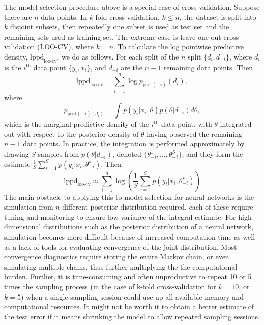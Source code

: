 \documentclass[12pt]{report}
\begin{document}
The model selection procedure above is a special case of cross-validation. Suppose there are $n$ data points. In $k$-fold cross validation,
$k\le n$, the dataset is split into $k$ disjoint subsets, then repeatedly one
subset is used as test set and the remaining sets used as training set. The
extreme case is leave-one-out cross-validation (LOO-CV), where $k=n$. To
calculate the log pointwise predictive density, $\text{lppd}_{\text{loo-cv}}$, we do as
follows. For each split of the $n$ split $\{d_i,d_{-i}\}$, where $d_i$ is the
$i^{\text{th}}$ data point $\{y_i,x_i\}$, and $d_{-i}$ are the $n-1$ remaining data points.
Then
\[ \text{lppd}_{\text{loo-cv}} = \sum_{i=1}^n \log p_{\text{post}(-i)}(d_i), \]
where 
\[p_{\text{post}(-i)(d_i)} = \int p(y_i|x_i,\theta) p(\theta |d_{-i}) d\theta, \]
which is the marginal predictive density of the $i^\text{th}$ data point, with $\theta$
integrated out with respect to the posterior density of $\theta$ having observed
the remaining $n-1$ data points. In practice, the integration is performed
approximately by drawing $S$ samples from $p(\theta|d_{-i})$, denoted
$\{\theta_{-i}^1,\dots, \theta_{-i}^S\}$, and they form the estimate
$\frac{1}{S} \sum_{s=1}^S p(y_i|x_i,\theta_{-i}^s) $.
Then
\[\text{lppd}_{\text{loo-cv}} \approx \sum_{i=1}^n \log (\frac{1}{S} \sum_{s=1}^S
p(y_i|x_i,\theta_{-i}^s))\]
The main obstacle to applying this to model selection for neural networks is the
simulation from $n$ different posterior distribution required, each of these
require tuning and monitoring to ensure low variance of the integral estimate.
For high dimensional distributions such as the posterior distribution of a neural
network, simulation becomes more difficult because of increased computation time as
well as a lack of tools for evaluating convergence of the joint distribution.
Most convergence diagnostics require storing the entire Markov chain, or even
simulating multiple chains, thus further multiplying the the computational burden. Further, it is time-consuming and often unproductive to repeat 10 or 5 times the sampling process  
(in the case of k-fold cross-validation for $k=10$, or $k=5$) when a single sampling session could use up all available memory and computational resources. 
It might not be worth it to obtain a better estimate of the test error if it means shrinking the model to allow repeated sampling sessions.
\end{document}
